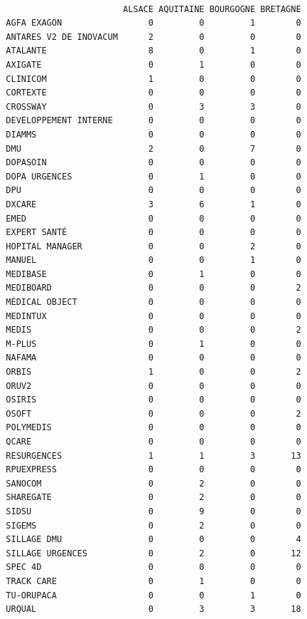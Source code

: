 \documentclass[]{article}
\begin{document}
\begin{verbatim}
                        
                         ALSACE AQUITAINE BOURGOGNE BRETAGNE
  AGFA EXAGON                 0         0         1        0
  ANTARES V2 DE INOVACUM      2         0         0        0
  ATALANTE                    8         0         1        0
  AXIGATE                     0         1         0        0
  CLINICOM                    1         0         0        0
  CORTEXTE                    0         0         0        0
  CROSSWAY                    0         3         3        0
  DEVELOPPEMENT INTERNE       0         0         0        0
  DIAMMS                      0         0         0        0
  DMU                         2         0         7        0
  DOPASOIN                    0         0         0        0
  DOPA URGENCES               0         1         0        0
  DPU                         0         0         0        0
  DXCARE                      3         6         1        0
  EMED                        0         0         0        0
  EXPERT SANTÉ                0         0         0        0
  HOPITAL MANAGER             0         0         2        0
  MANUEL                      0         0         1        0
  MEDIBASE                    0         1         0        0
  MEDIBOARD                   0         0         0        2
  MÉDICAL OBJECT              0         0         0        0
  MEDINTUX                    0         0         0        0
  MEDIS                       0         0         0        2
  M-PLUS                      0         1         0        0
  NAFAMA                      0         0         0        0
  ORBIS                       1         0         0        2
  ORUV2                       0         0         0        0
  OSIRIS                      0         0         0        0
  OSOFT                       0         0         0        2
  POLYMEDIS                   0         0         0        0
  QCARE                       0         0         0        0
  RESURGENCES                 1         1         3       13
  RPUEXPRESS                  0         0         0        0
  SANOCOM                     0         2         0        0
  SHAREGATE                   0         2         0        0
  SIDSU                       0         9         0        0
  SIGEMS                      0         2         0        0
  SILLAGE DMU                 0         0         0        4
  SILLAGE URGENCES            0         2         0       12
  SPEC 4D                     0         0         0        0
  TRACK CARE                  0         1         0        0
  TU-ORUPACA                  0         0         1        0
  URQUAL                      0         3         3       18
                        

\end{verbatim}
\end{document}

